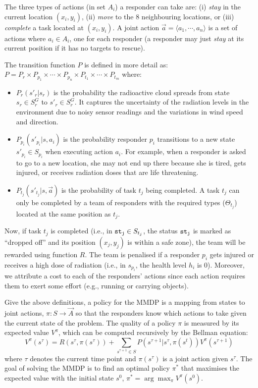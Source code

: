The three types of actions  (in set $A_i$) a responder can take
are: (i) {\em stay} in the current location $(x_i, y_i)$, (ii) {\em
move} to the 8 neighbouring locations, or (iii) {\em complete} a
task located at $(x_i, y_i)$. A joint action $\vec{a}=\langle a_1,
\cdots, a_n \rangle$ is a set of actions where $a_i\in A_i$, one
for each responder (a responder may just \emph{stay} at its current
position if it has no targets to rescue).

The transition function $P$ is defined in more detail as: $P= P_r
\times P_{p_1} \times \cdots \times P_{p_n} \times P_{t_1} \times
\cdots \times P_{t_m}$ where:
\begin{itemize}
    \item $P_r(s'_r|s_r)$ is the probability the radioactive
        cloud spreads from state $s_r\in S^G_r$ to $s'_r\in
        S^G_r$. It captures the uncertainty of the  radiation
        levels in the environment due to  noisy sensor readings
        and the variations in wind speed and direction.
    \item $P_{p_i}(s'_{p_i}|s, a_i)$ is the probability
        responder $p_i$ transitions to a new state $s'_{p_i}\in
        S_{p_i}$ when executing action $a_i$. For example, when
        a responder is asked to go to a new location,  she
        may not end up there because  she is tired,
        gets injured, or receives radiation doses that are life
        threatening.
    \item $P_{t_j}(s'_{t_j}|s, \vec{a})$ is the probability
        of task $t_j$ being completed. A task $t_j$ can only be completed by a
        team of responders with the required types ($\Theta_{t_j}$) located at the
        same position as $t_j$.
\end{itemize}

Now,  if task $t_j$ is completed (i.e., in ${\tt st_j}\in S_{t_j}$,
the status ${\tt st_j}$ is marked as ``dropped off'' and its
position $(x_j, y_j)$ is within a safe zone), the team will be
rewarded using function $R$. The team is penalised if a responder
$p_i$ gets injured or receives a high dose of radiation (i.e., in
$s_{p_i}$, the health level $h_i$ is 0). Moreover, we attribute a
cost to each of the responders' actions since  each  action
requires them to exert some effort (e.g., running or carrying
objects).

Give the above definitions, a policy for the MMDP is a mapping from
states to joint actions, $\pi: S \rightarrow \vec{A}$ so that the
responders know which actions to take given the current state of
the problem. The quality of a policy $\pi$ is  measured by
its expected value $V^\pi$, which can be computed recursively by
the Bellman equation:
\begin{equation}
  V^\pi(s^\tau) = R(s^\tau, \pi(s^\tau)) + \sum_{s^{\tau+1}\in S}
  P(s^{\tau+1}|s^\tau, \pi(s^t)) V^\pi(s^{\tau+1})
\end{equation}
where $\tau$ denotes the current time point and $\pi(s^\tau)$ is a
joint action given $s^\tau$. The goal of solving the MMDP is to
find an optimal policy $\pi^*$ that maximises the expected value
with the initial state $s^0$, $\pi^* = \arg\max_{\pi} V^\pi(s^0)$.

